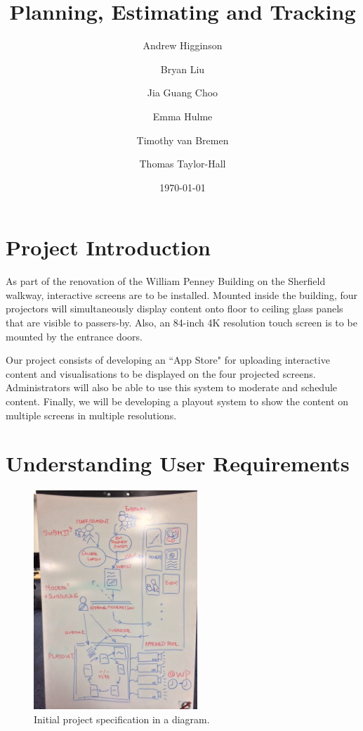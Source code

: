 \documentclass[a4paper]{article}
\begin{document}
\title{Planning, Estimating and Tracking}
\author{Andrew Higginson \and Bryan Liu \and Jia Guang Choo \and Emma Hulme \and 
Timothy van Bremen \and Thomas Taylor-Hall}
\date{\today}
\maketitle

\setcounter{table}{0}
\linespread{1.1}

\section{Project Introduction}
As part of the renovation of the William Penney Building on the Sherfield 
walkway, interactive screens are to be installed. Mounted inside the building, four projectors will simultaneously display content onto floor to ceiling glass
panels that are visible to passers-by. Also, an 84-inch 4K resolution touch 
screen is to be mounted by the entrance doors. 

Our project consists of developing an ``App Store" for uploading interactive content and visualisations to be displayed on the four projected screens. Administrators will also be able to use this system to moderate and schedule content. Finally, we will be developing a playout system to show the content on multiple screens in multiple resolutions.

\section{Understanding User Requirements}

\begin{figure}[H]
  \centering
    \includegraphics[width = 0.55\textwidth, trim= 0 0.55cm 0 1.4cm, clip]{./planning/userreq.jpg}

  \caption{Initial project specification in a diagram.}
  \label{fig:userreq}
\end{figure}
\end{document}
